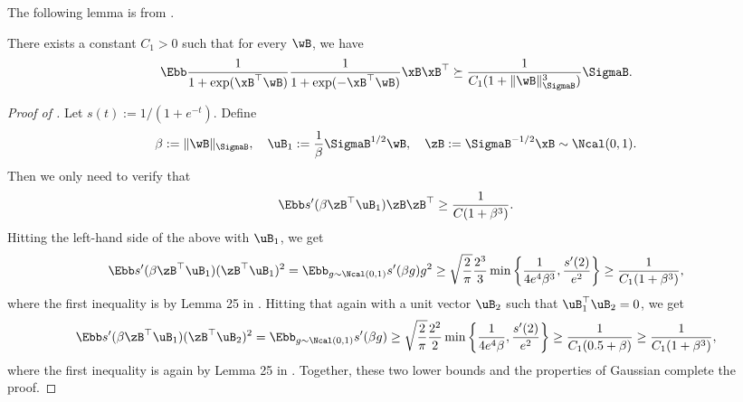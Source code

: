 \documentclass[11pt]{article}
\begin{document}
The following lemma is from \citep{chardon2024finite}.
\begin{lemma}\label{lemma:population-hessian}
There exists a constant $C_1>0$ such that for every $\wB$, we have
\begin{align*}
    \Ebb \frac{1}{1+\exp(\xB^\top \wB)} \frac{1}{1+\exp(-\xB^\top\wB)} \xB \xB^\top \succeq \frac{1}{C_1(1+\|\wB\|^3_{\SigmaB})} \SigmaB.
\end{align*}    
\end{lemma}
\begin{proof}[Proof of ]
Let $s(t) := 1/(1+e^{-t})$. Define
\[\beta := \|\wB\|_{\SigmaB},\quad 
\uB_1 := \frac{1}{\beta}\SigmaB^{1/2}\wB,\quad 
\zB := \SigmaB^{-1/2}\xB\sim \Ncal(0,1).\]
Then we only need to verify that
\begin{align*}
    \Ebb s'(\beta \zB^\top \uB_1) \zB\zB^\top \ge \frac{1}{C (1+\beta^3)}.
\end{align*}
Hitting the left-hand side of the above with $\uB_1$, we get 
\begin{align*}
    \Ebb s'(\beta \zB^\top \uB_1) (\zB^\top \uB_1)^2 
    = \Ebb_{g\sim \Ncal(0,1)} s'(\beta g) g^2  
    \ge \sqrt{\frac{2}{\pi}}\frac{2^3}{3}\min\bigg\{\frac{1}{4e^4\beta^3}, \frac{s'(2)}{e^2}\bigg\} \ge \frac{1}{C_1 (1+\beta^3)},
\end{align*}
where the first inequality is by Lemma 25 in \citet{chardon2024finite}.
Hitting that again with a unit vector $\uB_2$ such that $\uB_1^\top\uB_2=0$, we get 
\begin{align*}
    \Ebb s'(\beta \zB^\top \uB_1) (\zB^\top \uB_2)^2 
= \Ebb_{g\sim \Ncal(0,1)} s'(\beta g) 
    \ge \sqrt{\frac{2}{\pi}}\frac{2^2}{2}\min\bigg\{\frac{1}{4e^4\beta}, \frac{s'(2)}{e^2}\bigg\} \ge \frac{1}{C_1(0.5+\beta)} \ge \frac{1}{C_1(1+\beta^3)},
\end{align*}
where the first inequality is again by Lemma 25 in \citet{chardon2024finite}.
Together, these two lower bounds and the properties of Gaussian complete the proof.
\end{proof}
\end{document}
